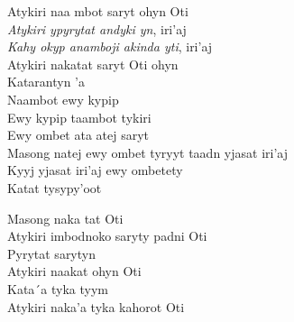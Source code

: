 \begin{linenumbers}\begingroup\raggedright
\noindent Atykiri naa mbot saryt ohyn Oti\\
\emph{Atykiri ypyrytat andyki yn}, iri'aj\\
\emph{Kahy okyp anamboji akinda yti}, iri'aj\\
Atykiri nakatat saryt Oti ohyn\\
Katarantyn 'a\\
Naambot ewy kypip\\
Ewy kypip taambot tykiri\\
Ewy ombet ata atej saryt\\
Masong natej ewy ombet tyryyt taadn yjasat iri'aj\\
Kyyj yjasat iri'aj ewy ombetety\\
Katat tysypy'oot

\end{linenumbers}\endgroup

\bigskip

\begin{linenumbers}\begingroup\raggedright
\noindent Masong naka tat Oti\\
Atykiri imbodnoko saryty padni Oti\\
Pyrytat sarytyn\\
Atykiri naakat ohyn Oti\\
Kata´a tyka tyym\\
Atykiri naka'a tyka kahorot Oti

\end{linenumbers}\endgroup

